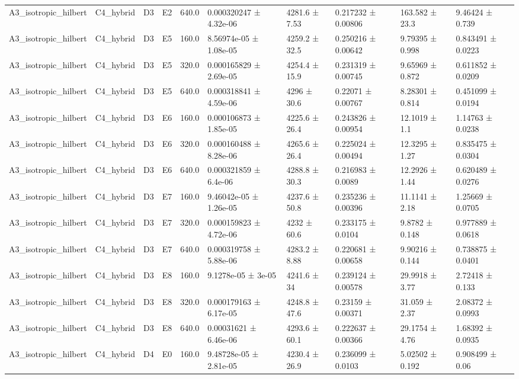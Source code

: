 \begin{table}
\begin{tabular}{llllllllll}
A3\_isotropic\_hilbert & C4\_hybrid & D3 & E2 & 640.0 & 0.000320247 ± 4.32e-06 & 4281.6 ± 7.53 & 0.217232 ± 0.00806 & 163.582 ± 23.3 & 9.46424 ± 0.739 \\
A3\_isotropic\_hilbert & C4\_hybrid & D3 & E5 & 160.0 & 8.56974e-05 ± 1.08e-05 & 4259.2 ± 32.5 & 0.250216 ± 0.00642 & 9.79395 ± 0.998 & 0.843491 ± 0.0223 \\
A3\_isotropic\_hilbert & C4\_hybrid & D3 & E5 & 320.0 & 0.000165829 ± 2.69e-05 & 4254.4 ± 15.9 & 0.231319 ± 0.00745 & 9.65969 ± 0.872 & 0.611852 ± 0.0209 \\
A3\_isotropic\_hilbert & C4\_hybrid & D3 & E5 & 640.0 & 0.000318841 ± 4.59e-06 & 4296 ± 30.6 & 0.22071 ± 0.00767 & 8.28301 ± 0.814 & 0.451099 ± 0.0194 \\
A3\_isotropic\_hilbert & C4\_hybrid & D3 & E6 & 160.0 & 0.000106873 ± 1.85e-05 & 4225.6 ± 26.4 & 0.243826 ± 0.00954 & 12.1019 ± 1.1 & 1.14763 ± 0.0238 \\
A3\_isotropic\_hilbert & C4\_hybrid & D3 & E6 & 320.0 & 0.000160488 ± 8.28e-06 & 4265.6 ± 26.4 & 0.225024 ± 0.00494 & 12.3295 ± 1.27 & 0.835475 ± 0.0304 \\
A3\_isotropic\_hilbert & C4\_hybrid & D3 & E6 & 640.0 & 0.000321859 ± 6.4e-06 & 4288.8 ± 30.3 & 0.216983 ± 0.0089 & 12.2926 ± 1.44 & 0.620489 ± 0.0276 \\
A3\_isotropic\_hilbert & C4\_hybrid & D3 & E7 & 160.0 & 9.46042e-05 ± 1.26e-05 & 4237.6 ± 50.8 & 0.235236 ± 0.00396 & 11.1141 ± 2.18 & 1.25669 ± 0.0705 \\
A3\_isotropic\_hilbert & C4\_hybrid & D3 & E7 & 320.0 & 0.000159823 ± 4.72e-06 & 4232 ± 60.6 & 0.233175 ± 0.0104 & 9.8782 ± 0.148 & 0.977889 ± 0.0618 \\
A3\_isotropic\_hilbert & C4\_hybrid & D3 & E7 & 640.0 & 0.000319758 ± 5.88e-06 & 4283.2 ± 8.88 & 0.220681 ± 0.00658 & 9.90216 ± 0.144 & 0.738875 ± 0.0401 \\
A3\_isotropic\_hilbert & C4\_hybrid & D3 & E8 & 160.0 & 9.1278e-05 ± 3e-05 & 4241.6 ± 34 & 0.239124 ± 0.00578 & 29.9918 ± 3.77 & 2.72418 ± 0.133 \\
A3\_isotropic\_hilbert & C4\_hybrid & D3 & E8 & 320.0 & 0.000179163 ± 6.17e-05 & 4248.8 ± 47.6 & 0.23159 ± 0.00371 & 31.059 ± 2.37 & 2.08372 ± 0.0993 \\
A3\_isotropic\_hilbert & C4\_hybrid & D3 & E8 & 640.0 & 0.00031621 ± 6.46e-06 & 4293.6 ± 60.1 & 0.222637 ± 0.00366 & 29.1754 ± 4.76 & 1.68392 ± 0.0935 \\
A3\_isotropic\_hilbert & C4\_hybrid & D4 & E0 & 160.0 & 9.48728e-05 ± 2.81e-05 & 4230.4 ± 26.9 & 0.236099 ± 0.0103 & 5.02502 ± 0.192 & 0.908499 ± 0.06 \\

\end{tabular}
\end{table}

